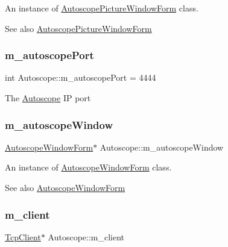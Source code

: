 An instance of \mbox{\hyperlink{class_autoscope_picture_window_form}{Autoscope\+Picture\+Window\+Form}} class. 

\begin{DoxySeeAlso}{See also}
\mbox{\hyperlink{class_autoscope_picture_window_form}{Autoscope\+Picture\+Window\+Form}} 
\end{DoxySeeAlso}
\mbox{\label{class_autoscope_abb67968cc6c6678995512aa1a05ad0e1}} 
\subsubsection{\texorpdfstring{m\_autoscopePort}{m\_autoscopePort}}
{\footnotesize\ttfamily int Autoscope\+::m\+\_\+autoscope\+Port = 4444\hspace{0.3cm}{\ttfamily [private]}}

The \mbox{\hyperlink{class_autoscope}{Autoscope}} IP port \mbox{\label{class_autoscope_a33104164061c784c65c1f94bfde26423}} 
\subsubsection{\texorpdfstring{m\_autoscopeWindow}{m\_autoscopeWindow}}
{\footnotesize\ttfamily \mbox{\hyperlink{class_autoscope_window_form}{Autoscope\+Window\+Form}}$\ast$ Autoscope\+::m\+\_\+autoscope\+Window\hspace{0.3cm}{\ttfamily [private]}}



An instance of \mbox{\hyperlink{class_autoscope_window_form}{Autoscope\+Window\+Form}} class. 

\begin{DoxySeeAlso}{See also}
\mbox{\hyperlink{class_autoscope_window_form}{Autoscope\+Window\+Form}} 
\end{DoxySeeAlso}
\mbox{\label{class_autoscope_af6e7a8d7cf7014e9b0f9296e2b7d7fd5}} 
\subsubsection{\texorpdfstring{m\_client}{m\_client}}
{\footnotesize\ttfamily \mbox{\hyperlink{class_tcp_client}{Tcp\+Client}}$\ast$ Autoscope\+::m\+\_\+client\hspace{0.3cm}{\ttfamily [private]}}



